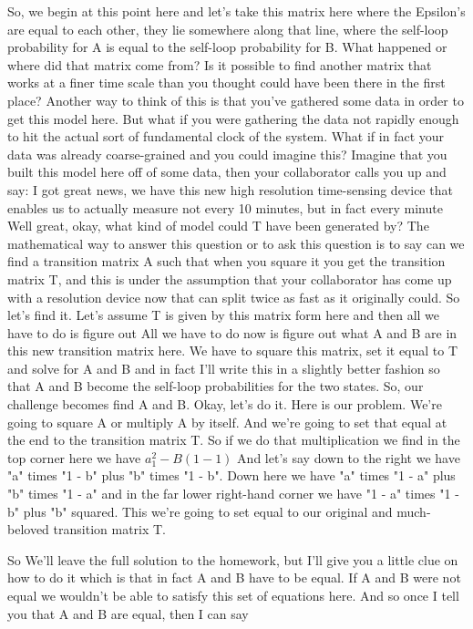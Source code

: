 \documentclass[]{article}
\begin{document}
So, we begin at this point here
and let's take this matrix here where
the Epsilon's are equal to each other,
they lie somewhere along that line,
where the self-loop probability for A
is equal to the self-loop probability for B.
What happened or where
did that matrix come from?
Is it possible to find another matrix
that works at a finer time scale
than you thought could have
been there in the first place?
Another way to think of this is that
you've gathered some data
in order to get this model here.
But what if you were gathering
the data not rapidly enough
to hit the actual sort of fundamental clock of the system.
What if in fact your data was already
coarse-grained and you could imagine this?
Imagine that you built this model
here off of some data,
then your collaborator calls you up
and say: I got great news,
we have this new high resolution
time-sensing device
that enables us to actually measure not
every 10 minutes, but in fact every minute
Well great, okay, what kind of model
could T have been generated by?
The mathematical way to answer this
question or to ask this question
is to say can we find a transition matrix A
such that when you square it you get the transition matrix T,
and this is under the assumption that your collaborator has come up
with a resolution device now that can split
twice as fast as it originally could.
So let's find it. Let's assume T
is given by this matrix form here
and then all we have to do is figure out
All we have to do now is figure out
what A and B are in this new transition matrix here.
We have to square this matrix,
set it equal to T and solve for A and B
and in fact I'll write this
in a slightly better fashion
so that A and B become
the self-loop probabilities
for the two states.
So, our challenge becomes
find A and B.
Okay, let's do it.
Here is our problem. We're going to
square A or multiply A by itself.
And we're going to set that equal
at the end to the transition matrix T.
So if we do that multiplication
we find in the top corner here
we have $a^2_1-B(1-1)$
And let's say down to the right
we have "a" times "1 - b" plus "b" times "1 - b".
Down here we have
"a" times "1 - a" plus "b" times "1 - a"
and in the far lower right-hand corner
we have
"1 - a" times "1 - b" plus "b" squared.
This we're going to set equal to our original
and much-beloved transition matrix T.

So
We'll leave the full solution
to the homework,
but I'll give you a little clue on how to do it
which is that in fact A and B have to be equal.
If A and B were not equal
we wouldn't be able to satisfy
this set of equations here.
And so once I tell you that A and B
are equal, then I can say
\end{document}
